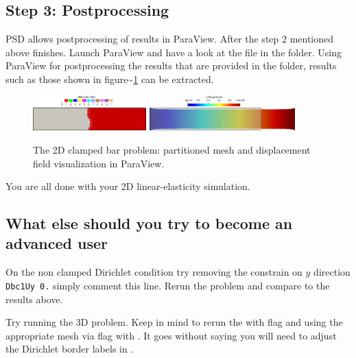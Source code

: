 \subsection{Step 3: Postprocessing}

PSD allows postprocessing of results in ParaView. After the step 2
mentioned above finishes. Launch ParaView and have a look at the
 file in the  folder. Using ParaView for
postprocessing the results that are provided in the 
folder, results such as those shown in
figure\textasciitilde{}\ref{bar-le-full-clamped} can be extracted.

\begin{figure}[h!]
\centering
\includegraphics[width=0.39\textwidth]{./Images/le-2d-bar-clamped-pulled-partioned}\hfill
\includegraphics[width=0.5\textwidth]{./Images/le-2d-bar-clamped-pulled.png}
\caption{The 2D clamped bar problem: partitioned mesh and displacement field visualization in ParaView. \label{bar-le-full-clamped}}
\end{figure}

You are all done with your 2D linear-elasticity simulation.

\subsection{What else should you try to become an advanced user}

On the non clamped Dirichlet condition try removing the constrain on
\(y\) direction \lstinline!Dbc1Uy 0.! simply comment this line. Rerun
the problem and compare to the results above.

Try running the 3D problem. Keep in mind to rerun the
 with  flag and using the
appropriate mesh via  flag with . It goes
without saying you will need to adjust the Dirichlet border labels in
.
